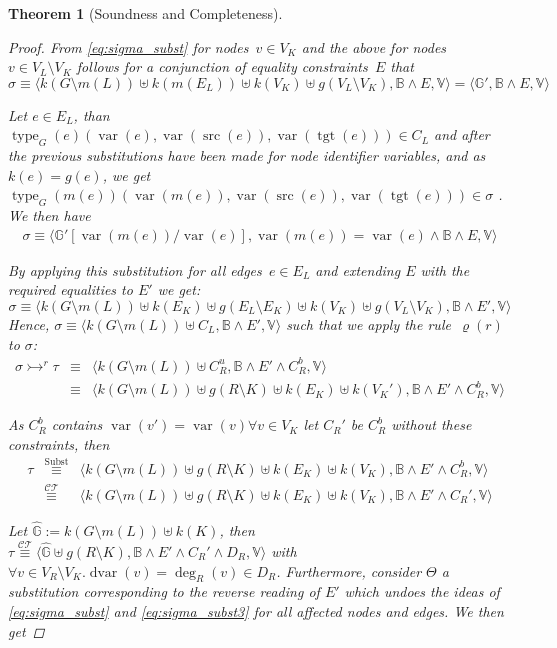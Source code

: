 \documentclass{tlp}
\newtheorem{theorem}{Theorem}\newtheorem{corollary}[theorem]{Corollary}
\newcommand{\st}[3]{\ensuremath{\langle #1 , #2 , #3 \rangle}}
\newcommand{\CT}{\ensuremath{\mathcal{CT}}}
\newcommand{\bbB}{\ensuremath{\mathbb{B}}}
\newcommand{\bbG}{\ensuremath{\mathbb{G}}}
\newcommand{\bbV}{\ensuremath{\mathbb{V}}}
\newcommand{\der}{\ensuremath{\rightarrowtail}}
\DeclareMathOperator{\var}{var}
\DeclareMathOperator{\dvar}{dvar}
\DeclareMathOperator{\type}{type}
\DeclareMathOperator{\src}{src}
\DeclareMathOperator{\tgt}{tgt}
\newcommand{\chrrule}{\ensuremath{\varrho}}
\newcommand{\eqct}{\ensuremath{\stackrel{\CT}{\equiv}}}
\newcommand{\eqsubst}{\ensuremath{\stackrel{\text{Subst}}{\equiv}}}
\begin{document}
\begin{theorem}[Soundness and Completeness]
\begin{proof}
From \eqref{eq:sigma_subst} for nodes~$v \in V_K$ and the above for nodes~$v \in
V_L \setminus V_K$ follows for a conjunction of equality constraints~$E$ that \[
\sigma \equiv \st{k(G\setminus m(L)) \uplus k(m(E_L)) \uplus k(V_K) \uplus g(V_L
\setminus V_K)}{\bbB \land E}{\bbV} =
\st{\bbG'}{\bbB \land E}{\bbV}
\]

Let $e \in E_L$, than $\type_G(e)(\var(e),\var(\src(e)),\var(\tgt(e))) \in C_L$
and after the previous substitutions have been made for node identifier
variables, and as $k(e) = g(e)$, we get
$\type_G(m(e))(\var(m(e)),\var(\src(e)),\var(\tgt(e))) \in \sigma$ . We then have
\begin{eqnarray}\label{eq:sigma_subst3}
\sigma \equiv
\st{\bbG'[\var(m(e))/\var(e)]}{\var(m(e)) = \var(e) \land \bbB \land E}{\bbV}
\end{eqnarray}

By applying this substitution for all edges~$e \in E_L$ and extending $E$ with
the required equalities to $E'$ we get: \[ \sigma \equiv \st{k(G\setminus m(L))
\uplus k(E_K) \uplus g(E_L \setminus E_K) \uplus k(V_K) \uplus g(V_L \setminus
V_K)}{\bbB \land E'}{\bbV} \] Hence, $\sigma \equiv \st{k(G \setminus m(L))
\uplus C_L}{\bbB \land E'}{\bbV}$ such that we apply the rule~$\chrrule(r)$ to
$\sigma$: \[
\begin{array}{lcl}
 \sigma \der^r \tau & \equiv & \st{k(G \setminus m(L))
\uplus C_R^u}{\bbB \land E' \land C_R^b}{\bbV}\\
& \equiv & \st{k(G \setminus m(L)) \uplus g(R \setminus K) \uplus k(E_K) \uplus
k(V_K')}{\bbB \land E' \land C_R^b}{\bbV}
\end{array}
\]

As $C_R^b$ contains $\var(v') = \var(v) \forall v \in V_K$ let $C_R'$ be
$C_R^b$ without these constraints, then
\[
\begin{array}{lcl}
\tau & \eqsubst & \st{k(G \setminus m(L)) \uplus g(R \setminus K) \uplus k(E_K)
\uplus k(V_K)}{\bbB \land E' \land C_R^b}{\bbV} \\
 & \eqct & \st{k(G \setminus m(L)) \uplus g(R \setminus K) \uplus k(E_K) \uplus
 k(V_K)}{\bbB \land E' \land C_R'}{\bbV}
\end{array}
\]

Let $\hat{\bbG} := k(G\setminus m(L)) \uplus k(K)$, then $\tau \eqct
\st{\hat{\bbG} \uplus g(R \setminus K)}{\bbB \land E' \land C_R' \land
D_R}{\bbV}$ with $\forall v \in V_R \setminus V_K . \dvar(v) = \deg_R(v) \in
D_R$. Furthermore, consider $\Theta$ a substitution corresponding to the reverse
reading of $E'$ which undoes the ideas of \eqref{eq:sigma_subst} and
\eqref{eq:sigma_subst3} for all affected nodes and edges. We then get


\end{proof}
\end{theorem}
\end{document}
